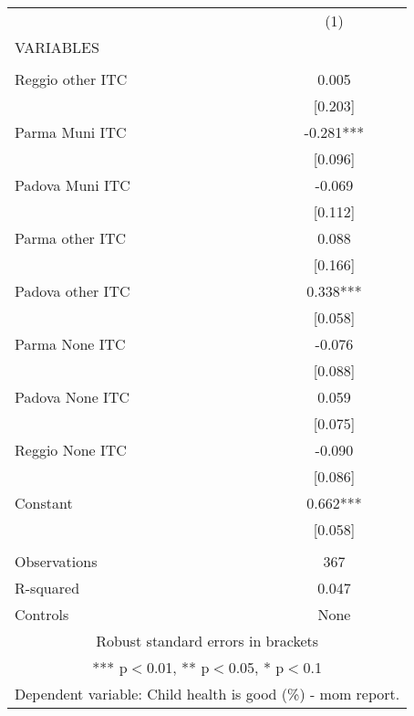 \begin{tabular}{lc} \hline
 & (1) \\
VARIABLES &  \\ \hline
 &  \\
Reggio other ITC & 0.005 \\
 & [0.203] \\
Parma Muni ITC & -0.281*** \\
 & [0.096] \\
Padova Muni ITC & -0.069 \\
 & [0.112] \\
Parma other ITC & 0.088 \\
 & [0.166] \\
Padova other ITC & 0.338*** \\
 & [0.058] \\
Parma None ITC & -0.076 \\
 & [0.088] \\
Padova None ITC & 0.059 \\
 & [0.075] \\
Reggio None ITC & -0.090 \\
 & [0.086] \\
Constant & 0.662*** \\
 & [0.058] \\
 &  \\
Observations & 367 \\
R-squared & 0.047 \\
 Controls & None \\ \hline
\multicolumn{2}{c}{ Robust standard errors in brackets} \\
\multicolumn{2}{c}{ *** p$<$0.01, ** p$<$0.05, * p$<$0.1} \\
\multicolumn{2}{c}{ Dependent variable: Child health is good (\%) - mom report.} \\
\end{tabular}

